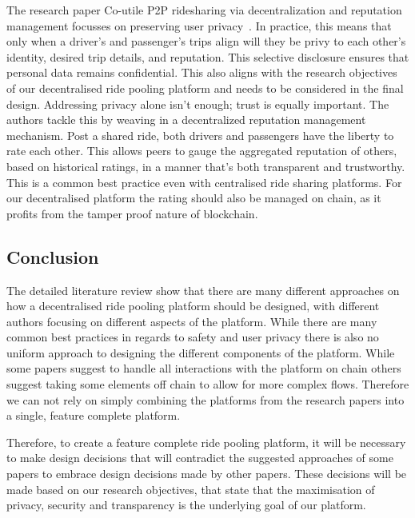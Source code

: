 The research paper Co-utile P2P ridesharing via decentralization and reputation management focusses on preserving user privacy~\cite{Sanchez.2016}. In practice, this means that only when a driver's and passenger's trips align will they be privy to each other's identity, desired trip details, and reputation. This selective disclosure ensures that personal data remains confidential. This also aligns with the research objectives of our decentralised ride pooling platform and needs to be considered in the final design.
Addressing privacy alone isn't enough; trust is equally important. The authors tackle this by weaving in a decentralized reputation management mechanism. Post a shared ride, both drivers and passengers have the liberty to rate each other. This allows peers to gauge the aggregated reputation of others, based on historical ratings, in a manner that's both transparent and trustworthy. This is a common best practice even with centralised ride sharing platforms. For our decentralised platform the rating should also be managed on chain, as it profits from the tamper proof nature of blockchain.

\subsection{Conclusion}
The detailed literature review show that there are many different approaches on how a decentralised ride pooling platform should be designed, with different authors focusing on different aspects of the platform. While there are many common best practices in regards to safety and user privacy there is also no uniform approach to designing the different components of the platform. While some papers suggest to handle all interactions with the platform on chain others suggest taking some elements off chain to allow for more complex flows. Therefore we can not rely on simply combining the platforms from the research papers into a single, feature complete platform.

Therefore, to create a feature complete ride pooling platform, it will be necessary to make design decisions that will contradict the suggested approaches of some papers to embrace design decisions made by other papers. These decisions will be made based on our research objectives, that state that the maximisation of privacy, security and transparency is the underlying goal of our platform.


